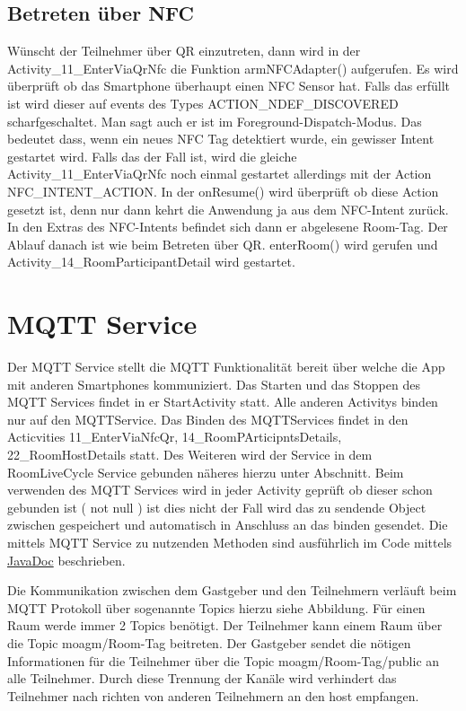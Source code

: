 \subsection{Betreten über NFC}
\label{subsec: Betreten über NFC}
Wünscht der Teilnehmer über QR einzutreten, dann wird in der Activity\_11\_EnterViaQrNfc die Funktion armNFCAdapter() aufgerufen. Es wird überprüft ob das Smartphone überhaupt einen NFC Sensor hat.
Falls das erfüllt ist wird dieser auf events des Types ACTION\_NDEF\_DISCOVERED scharfgeschaltet. 
Man sagt auch er ist im Foreground-Dispatch-Modus.
Das bedeutet dass, wenn ein neues NFC Tag detektiert wurde, ein gewisser Intent gestartet wird. 
Falls das der Fall ist, wird die gleiche Activity\_11\_EnterViaQrNfc noch einmal gestartet allerdings mit der Action NFC\_INTENT\_ACTION. 
In der onResume() wird überprüft ob diese Action gesetzt ist, denn nur dann kehrt die Anwendung ja aus dem NFC-Intent zurück. 
In den Extras des NFC-Intents befindet sich dann er abgelesene Room-Tag. Der Ablauf danach ist wie beim Betreten über QR. enterRoom() wird gerufen und Activity\_14\_RoomParticipantDetail wird gestartet.
\section{MQTT Service}
Der MQTT Service stellt die MQTT Funktionalität bereit über welche die App mit anderen Smartphones kommuniziert.
Das Starten und das Stoppen des MQTT Services findet in er StartActivity statt. Alle anderen Activitys binden nur auf den MQTTService. Das Binden des MQTTServices findet in den Acticvities 11\_EnterViaNfcQr, 14\_RoomPArticipntsDetails, 22\_RoomHostDetails statt. Des Weiteren wird der Service in dem RoomLiveCycle Service gebunden näheres hierzu unter Abschnitt.  Beim verwenden des MQTT Services wird in jeder Activity geprüft ob dieser schon gebunden ist ( not null ) ist dies nicht der Fall wird das zu sendende Object zwischen gespeichert und automatisch in Anschluss an das binden gesendet. 
Die mittels MQTT Service zu nutzenden Methoden sind ausführlich im Code mittels \href{https://scm.inftech.hs-mannheim.de/gogs/moa/20moagm/src/dev/Doku/javadoc}{JavaDoc} beschrieben. 

Die Kommunikation zwischen dem Gastgeber und den Teilnehmern verläuft beim MQTT Protokoll über sogenannte Topics hierzu siehe Abbildung. Für einen Raum werde immer 2 Topics benötigt. Der Teilnehmer kann einem Raum über die Topic moagm/Room-Tag beitreten. Der Gastgeber sendet die nötigen Informationen für die Teilnehmer über die Topic moagm/Room-Tag/public an alle Teilnehmer. Durch diese Trennung der Kanäle wird verhindert das Teilnehmer nach richten von anderen Teilnehmern an den host empfangen.

